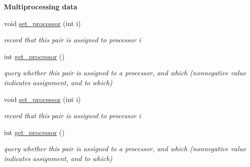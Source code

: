 \begin{Indent}\textbf{ Multiprocessing data}\par
\begin{DoxyCompactItemize}
\item 
\mbox{\label{group___g_b_computation_a4c0085660583e247f354735ee900f2d3}} 
void \hyperlink{group___g_b_computation_a4c0085660583e247f354735ee900f2d3}{set\+\_\+processor} (int i)
\begin{DoxyCompactList}\small\item\em record that this pair is assigned to processor {\ttfamily i} \end{DoxyCompactList}\item 
\mbox{\label{group___g_b_computation_a1f07b8a991c138ad6c8de5deeb64ece6}} 
int \hyperlink{group___g_b_computation_a1f07b8a991c138ad6c8de5deeb64ece6}{get\+\_\+processor} ()
\begin{DoxyCompactList}\small\item\em query whether this pair is assigned to a processor, and which (nonnegative value indicates assignment, and to which) \end{DoxyCompactList}\item 
\mbox{\label{group___g_b_computation_a4c0085660583e247f354735ee900f2d3}} 
void \hyperlink{group___g_b_computation_a4c0085660583e247f354735ee900f2d3}{set\+\_\+processor} (int i)
\begin{DoxyCompactList}\small\item\em record that this pair is assigned to processor {\ttfamily i} \end{DoxyCompactList}\item 
\mbox{\label{group___g_b_computation_a1f07b8a991c138ad6c8de5deeb64ece6}} 
int \hyperlink{group___g_b_computation_a1f07b8a991c138ad6c8de5deeb64ece6}{get\+\_\+processor} ()
\begin{DoxyCompactList}\small\item\em query whether this pair is assigned to a processor, and which (nonnegative value indicates assignment, and to which) \end{DoxyCompactList}\item 
\mbox{\label{group___g_b_computation_a4c0085660583e247f354735ee900f2d3}} 

\end{DoxyCompactItemize}
\end{Indent}
